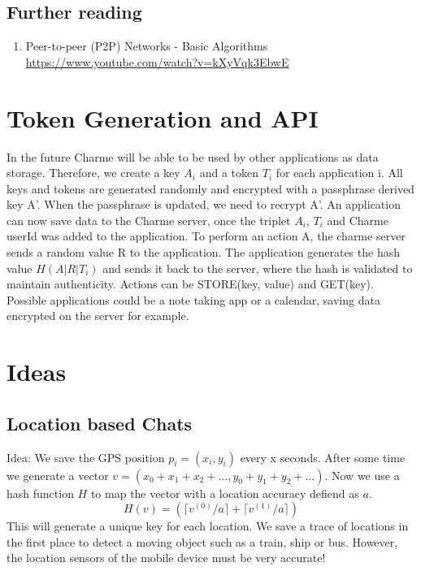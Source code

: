 \documentclass{scrartcl}
\begin{document}
\subsection{Further reading}
\begin{enumerate}
\item Peer-to-peer (P2P) Networks - Basic Algorithms \\\url{https://www.youtube.com/watch?v=kXyVqk3EbwE} %
\end{enumerate}

  \section{Token Generation and API}
  In the future Charme will be able to be used by other applications as data storage. Therefore, we create a key $A_i$ and a token $T_i$ for each application i.
All keys and tokens are generated randomly and encrypted with a passphrase derived key A'. When the passphrase is updated, we need to recrypt A'.
An application can now save data to the Charme server, once the triplet $A_i$, $T_i$ and Charme userId was added to the application.
To perform an action A, the charme server sends a random value R to the application. The application generates the hash value $H(A|R|T_i)$ and sends it back to the server, where the hash is validated to maintain authenticity. Actions can be  STORE(key, value) and GET(key). Possible applications could be a note taking app or a calendar, saving data encrypted on the server for example.

\section{Ideas}
  \subsection{Location based Chats}
  Idea: We save the GPS position $p_i = (x_i,y_i)$  every x seconds. After some time
  we generate a vector $v = (x_0+x_1+x_2+..., y_0+y_1+y_2+...)$. Now we use a hash function $H$ to map the vector with a location accuracy defiend as $a$. 
  $$
  H(v) = (\lceil v^{(0)}/a \rceil +\lceil v^{(1)}/a \rceil )
  $$
  This will generate a unique key for each location. We save a trace of locations in the first place to detect a moving object such as a train, ship or bus.  However, the location sensors of the mobile device must be very accurate!
  
  
  
\end{document}
